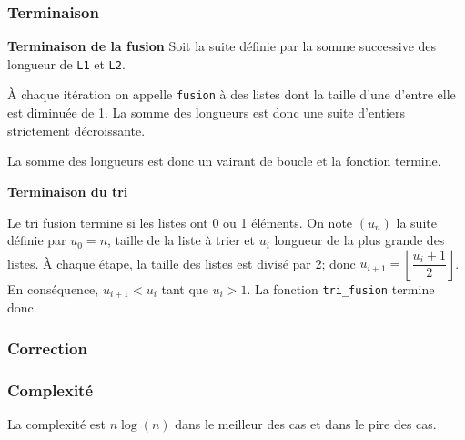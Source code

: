 
\subsubsection{Terminaison}
\textbf{Terminaison de la fusion}
Soit la suite définie par la somme successive des longueur de \texttt{L1} et \texttt{L2}.  	 

À chaque itération on appelle \texttt{fusion} à des listes dont la taille d'une d'entre elle est diminuée de 1. La somme des longueurs est donc une suite d'entiers strictement décroissante. 

La somme des longueurs est donc un vairant de boucle et la fonction termine. 

\textbf{Terminaison du tri}

Le tri fusion termine si les listes ont 0 ou 1 éléments. 
On note $\left(u_n\right)$ la suite définie par $u_0=n$, taille de la liste à trier et $u_i$ longueur de la plus grande des listes. À chaque étape, la taille des listes est divisé par 2; donc $u_{i+1} = \left\lfloor\dfrac{u_i +1 }{2}\right\rfloor$. En conséquence, $u_{i+1}<u_i$ tant que $u_i>1$.  La fonction \texttt{tri\_fusion} termine donc. 



\subsubsection{Correction}

\subsubsection{Complexité}

\begin{prop}

La complexité est \textbf{$n\log(n)$} dans le meilleur des cas et dans le pire des cas.

\end{prop}

